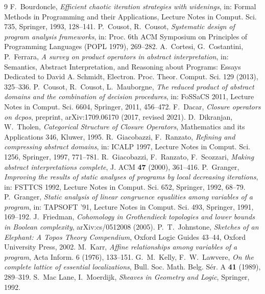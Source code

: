 \documentclass[11pt]{amsart}
\theoremstyle{definition}
\begin{document}
\begin{thebibliography}{9}
 F.~Bourdoncle, \emph{Efficient chaotic iteration
strategies with widenings}, in: Formal Methods in Programming and their
Applications, Lecture Notes in Comput. Sci. 735, Springer, 1993, 128--141.
 P.~Cousot, R.~Cousot, \emph{Systematic design of program
analysis frameworks}, in: Proc. 6th ACM Symposium on Principles of
Programming Languages (POPL 1979), 269--282.
 A.~Cortesi, G.~Costantini, P.~Ferrara, \emph{A survey on
product operators in abstract interpretation}, in: Semantics, Abstract
Interpretation, and Reasoning about Programs: Essays Dedicated to David
A. Schmidt, Electron. Proc. Theor. Comput. Sci. 129 (2013), 325--336.
 P.~Cousot, R.~Cousot, L.~Mauborgne, \emph{The reduced
product of abstract domains and the combination of decision procedures},
in: FoSSaCS 2011, Lecture Notes in Comput. Sci. 6604, Springer, 2011,
456--472.
 F.~Dacar, \emph{Closure operators on dcpos}, preprint,
arXiv:1709.06170 (2017, revised 2021).
 D.~Dikranjan, W.~Tholen, \emph{Categorical Structure of Closure
Operators}, Mathematics and its Applications 346, Kluwer, 1995.
 R.~Giacobazzi, F.~Ranzato, \emph{Refining and compressing
abstract domains}, in: ICALP 1997, Lecture Notes in Comput. Sci. 1256,
Springer, 1997, 771--781.
 R.~Giacobazzi, F.~Ranzato, F.~Scozzari, \emph{Making
abstract interpretations complete}, J. ACM \textbf{47} (2000), 361--416.
 P.~Granger, \emph{Improving the results of static analyses
of programs by local decreasing iterations}, in: FSTTCS 1992, Lecture Notes
in Comput. Sci. 652, Springer, 1992, 68--79.
 P.~Granger, \emph{Static analysis of linear congruence
equalities among variables of a program}, in: TAPSOFT '91, Lecture Notes
in Comput. Sci. 493, Springer, 1991, 169--192.
 J.~Friedman, \emph{Cohomology in Grothendieck
topologies and lower bounds in Boolean complexity}, arXiv:cs/0512008
(2005).
 P.~T.~Johnstone, \emph{Sketches of an Elephant: A Topos
Theory Compendium}, Oxford Logic Guides 43--44, Oxford University Press, 2002.
 M.~Karr, \emph{Affine relationships among variables of a
program}, Acta Inform. 6 (1976), 133--151.
 G.~M.~Kelly, F.~W.~Lawvere, \emph{On the complete lattice of
essential localizations}, Bull. Soc. Math. Belg. S\'er. A \textbf{41}
(1989), 289--319.
 S.~Mac Lane, I.~Moerdijk, \emph{Sheaves in Geometry and Logic},
Springer, 1992.

\end{thebibliography}
\end{document}
